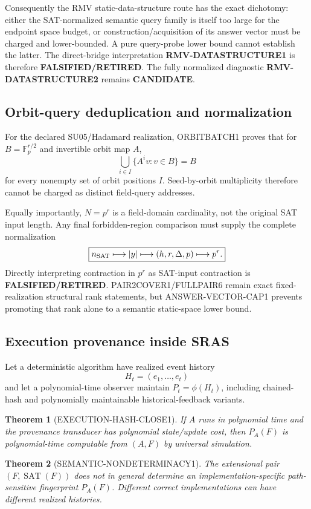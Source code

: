 \documentclass[11pt]{article}
\newcommand{\statuscandidate}{\textcolor{candidate}{\textbf{CANDIDATE}}}
\newcommand{\statusretired}{\textcolor{retired}{\textbf{FALSIFIED/RETIRED}}}
\theoremstyle{plain}
\newtheorem{theorem}{Theorem}[section]
\theoremstyle{definition}
\theoremstyle{remark}
\begin{document}
Consequently the RMV static-data-structure route has the exact dichotomy:
either the SAT-normalized semantic query family is itself too large for the
endpoint space budget, or construction/acquisition of its answer vector must
be charged and lower-bounded. A pure query-probe lower bound cannot establish
the latter. The direct-bridge interpretation \textbf{RMV-DATASTRUCTURE1} is
therefore \statusretired. The fully normalized diagnostic
\textbf{RMV-DATASTRUCTURE2} remains \statuscandidate.

\subsection{Orbit-query deduplication and normalization}

For the declared SU05/Hadamard realization, ORBITBATCH1 proves that for
\(B=\mathbb F_p^{r/2}\) and invertible orbit map \(A\),
\[
\bigcup_{i\in I}\{A^iv:v\in B\}=B
\]
for every nonempty set of orbit positions \(I\). Seed-by-orbit multiplicity
therefore cannot be charged as distinct field-query addresses.

Equally importantly, \(N=p^r\) is a field-domain cardinality, not the
original SAT input length. Any final forbidden-region comparison must supply
the complete normalization
\[
\boxed{
n_{\rm SAT}\longmapsto |y|
\longmapsto (h,r,\Delta,p)
\longmapsto p^r .
}
\]
Directly interpreting contraction in \(p^r\) as SAT-input contraction is
\statusretired. PAIR2COVER1/FULLPAIR6 remain exact fixed-realization
structural rank statements, but ANSWER-VECTOR-CAP1 prevents promoting that
rank alone to a semantic static-space lower bound.

\subsection{Execution provenance inside SRAS}

Let a deterministic algorithm have realized event history
\[
H_t=(e_1,\ldots,e_t)
\]
and let a polynomial-time observer maintain \(P_t=\phi(H_t)\), including
chained-hash and polynomially maintainable historical-feedback variants.

\begin{theorem}[EXECUTION-HASH-CLOSE1]
If \(A\) runs in polynomial time and the provenance transducer has polynomial
state/update cost, then \(P_A(F)\) is polynomial-time computable from
\((A,F)\) by universal simulation.
\end{theorem}

\begin{theorem}[SEMANTIC-NONDETERMINACY1]
The extensional pair \((F,\operatorname{SAT}(F))\) does not in general
determine an implementation-specific path-sensitive fingerprint \(P_A(F)\).
Different correct implementations can have different realized histories.
\end{theorem}
\end{document}
